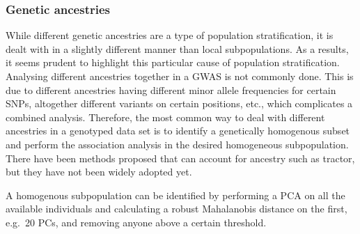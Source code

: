 \subsubsection{Genetic ancestries}
While different genetic ancestries are a type of population stratification, it is dealt with in a slightly different manner than local subpopulations. As a results, it seems prudent to highlight this particular cause of population stratification. Analysing different ancestries together in a GWAS is not commonly done. This is due to different ancestries having different minor allele frequencies for certain SNPs, altogether different variants on certain positions, etc., which complicates a combined analysis\cite{helgason2005icelandic}. Therefore, the most common way to deal with different ancestries in a genotyped data set is to identify a genetically homogenous subset and perform the association analysis in the desired homogeneous subpopulation. There have been methods proposed that can account for ancestry such as tractor\cite{atkinson2021tractor}, but they have not been widely adopted yet. 

A homogenous subpopulation can be identified by performing a PCA on all the available individuals and calculating a robust Mahalanobis distance on the first, e.g.\ 20 PCs, and removing anyone above a certain threshold\cite{prive2020efficient}. 
